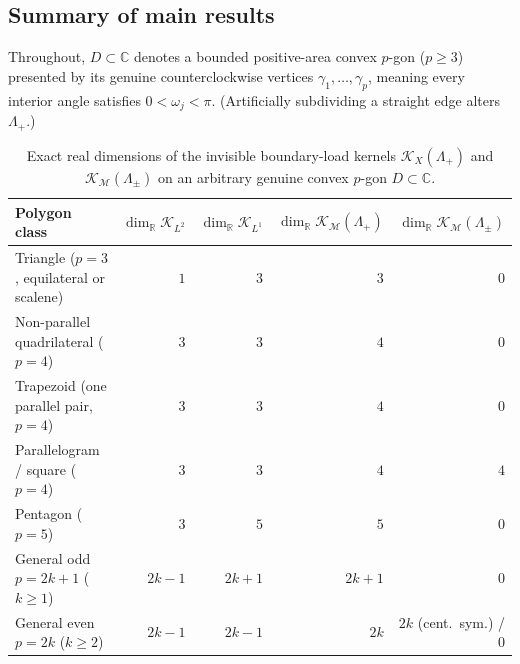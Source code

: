 \documentclass[11pt,reqno]{amsart}
\theoremstyle{definition}
\theoremstyle{remark}
\newcommand{\C}{\mathbb{C}}
\newcommand{\R}{\mathbb{R}}
\begin{document}
\subsection*{Summary of main results}
Throughout, $D \subset \C$ denotes a bounded positive-area convex $p$-gon ($p \ge 3$) presented by its genuine counterclockwise vertices $\gamma_1,\dots,\gamma_p$, meaning every interior angle satisfies $0 < \omega_j < \pi$. (Artificially subdividing a straight edge alters $\Lambda_+$.)

\begin{table}[ht]
\centering
\caption{Exact real dimensions of the invisible boundary-load kernels $\mathcal{K}_X(\Lambda_+)$ and $\mathcal{K}_{\mathcal{M}}(\Lambda_\pm)$ on an arbitrary genuine convex $p$-gon $D \subset \C$.}
\label{tab:dimensions}
\footnotesize
\begin{tabular}{lrrrr}
\toprule
Polygon class & $\dim_\R \mathcal{K}_{L^2}$ & $\dim_\R \mathcal{K}_{L^1}$ & $\dim_\R \mathcal{K}_{\mathcal{M}}(\Lambda_+)$ & $\dim_\R \mathcal{K}_{\mathcal{M}}(\Lambda_\pm)$ \\
\midrule
Triangle ($p=3$, equilateral or scalene) & $1$ & $3$ & $3$ & $0$ \\
Non-parallel quadrilateral ($p=4$) & $3$ & $3$ & $4$ & $0$ \\
Trapezoid (one parallel pair, $p=4$) & $3$ & $3$ & $4$ & $0$ \\
Parallelogram / square ($p=4$) & $3$ & $3$ & $4$ & $4$ \\
Pentagon ($p=5$) & $3$ & $5$ & $5$ & $0$ \\
General odd $p = 2k+1$ ($k \ge 1$) & $2k-1$ & $2k+1$ & $2k+1$ & $0$ \\
General even $p = 2k$ ($k \ge 2$) & $2k-1$ & $2k-1$ & $2k$ & $2k$ (cent.\ sym.) / $0$ \\
\bottomrule
\end{tabular}
\end{table}
\end{document}
